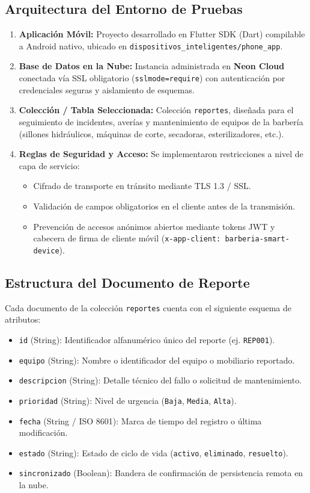\documentclass[11pt,a4paper]{article}
\begin{document}
\subsection{Arquitectura del Entorno de Pruebas}
\begin{enumerate}
    \item \textbf{Aplicación Móvil:} Proyecto desarrollado en Flutter SDK (Dart) compilable a Android nativo, ubicado en \texttt{dispositivos\_inteligentes/phone\_app}.
    \item \textbf{Base de Datos en la Nube:} Instancia administrada en \textbf{Neon Cloud} conectada vía SSL obligatorio (\texttt{sslmode=require}) con autenticación por credenciales seguras y aislamiento de esquemas.
    \item \textbf{Colección / Tabla Seleccionada:} Colección \texttt{reportes}, diseñada para el seguimiento de incidentes, averías y mantenimiento de equipos de la barbería (sillones hidráulicos, máquinas de corte, secadoras, esterilizadores, etc.).
    \item \textbf{Reglas de Seguridad y Acceso:} Se implementaron restricciones a nivel de capa de servicio:
    \begin{itemize}
        \item Cifrado de transporte en tránsito mediante TLS 1.3 / SSL.
        \item Validación de campos obligatorios en el cliente antes de la transmisión.
        \item Prevención de accesos anónimos abiertos mediante tokens JWT y cabecera de firma de cliente móvil (\texttt{x-app-client: barberia-smart-device}).
    \end{itemize}
\end{enumerate}

\subsection{Estructura del Documento de Reporte}
Cada documento de la colección \texttt{reportes} cuenta con el siguiente esquema de atributos:
\begin{itemize}
    \item \texttt{id} (String): Identificador alfanumérico único del reporte (ej. \texttt{REP001}).
    \item \texttt{equipo} (String): Nombre o identificador del equipo o mobiliario reportado.
    \item \texttt{descripcion} (String): Detalle técnico del fallo o solicitud de mantenimiento.
    \item \texttt{prioridad} (String): Nivel de urgencia (\texttt{Baja}, \texttt{Media}, \texttt{Alta}).
    \item \texttt{fecha} (String / ISO 8601): Marca de tiempo del registro o última modificación.
    \item \texttt{estado} (String): Estado de ciclo de vida (\texttt{activo}, \texttt{eliminado}, \texttt{resuelto}).
    \item \texttt{sincronizado} (Boolean): Bandera de confirmación de persistencia remota en la nube.
\end{itemize}
\end{document}
